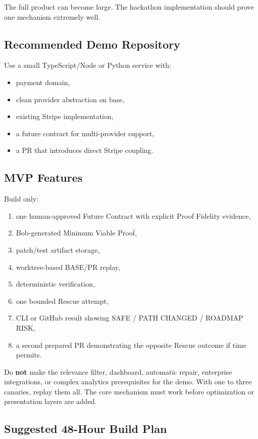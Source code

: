 \documentclass[12pt]{article}
\begin{document}
The full product can become large. The hackathon implementation should prove one mechanism extremely well.

\subsection{Recommended Demo Repository}

Use a small TypeScript/Node or Python service with:

\begin{itemize}
    \item payment domain,
    \item clean provider abstraction on base,
    \item existing Stripe implementation,
    \item a future contract for multi-provider support,
    \item a PR that introduces direct Stripe coupling.
\end{itemize}

\subsection{MVP Features}

Build only:

\begin{enumerate}
    \item one human-approved Future Contract with explicit Proof Fidelity evidence,
    \item Bob-generated Minimum Viable Proof,
    \item patch/test artifact storage,
    \item worktree-based BASE/PR replay,
    \item deterministic verification,
    \item one bounded Rescue attempt,
    \item CLI or GitHub result showing SAFE / PATH CHANGED / ROADMAP RISK,
    \item a second prepared PR demonstrating the opposite Rescue outcome if time permits.
\end{enumerate}

Do \textbf{not} make the relevance filter, dashboard, automatic repair, enterprise integrations, or complex analytics prerequisites for the demo. With one to three canaries, replay them all. The core mechanism must work before optimization or presentation layers are added.

\subsection{Suggested 48-Hour Build Plan}
\end{document}
